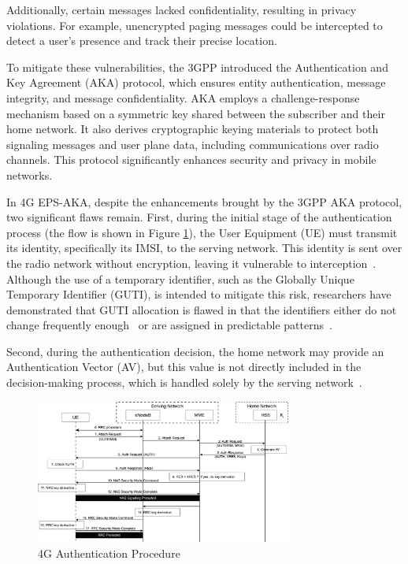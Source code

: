 Additionally, certain messages lacked confidentiality, resulting in privacy violations. For example, unencrypted paging messages could be intercepted to detect a user’s presence and track their precise location. 

To mitigate these vulnerabilities, the 3GPP introduced the Authentication and Key Agreement (AKA) protocol, which ensures entity authentication, message integrity, and message confidentiality. AKA employs a challenge-response mechanism based on a symmetric key shared between the subscriber and their home network. It also derives cryptographic keying materials to protect both signaling messages and user plane data, including communications over radio channels. This protocol significantly enhances security and privacy in mobile networks.

In 4G EPS-AKA, despite the enhancements brought by the 3GPP AKA protocol, two significant flaws remain. First, during the initial stage of the authentication process (the flow is shown in Figure \ref{fig:4g-authentication-procedure}), the User Equipment (UE) must transmit its identity, specifically its IMSI, to the serving network. This identity is sent over the radio network without encryption, leaving it vulnerable to interception~\cite{cbl-comp-4g-5g-p3}. Although the use of a temporary identifier, such as the Globally Unique Temporary Identifier (GUTI), is intended to mitigate this risk, researchers have demonstrated that GUTI allocation is flawed in that the identifiers either do not change frequently enough~\cite{gt-freq} or are assigned in predictable patterns~\cite{gt-pred}.

Second, during the authentication decision, the home network may provide an Authentication Vector (AV), but this value is not directly included in the decision-making process, which is handled solely by the serving network~\cite{cbl-comp-4g-5g-p4}.

\begin{figure}[htbp]
    \centering
    \includegraphics[width=0.75\textwidth]{figs/4g-authentication-procedure.png}
    \caption{\ac{4G} Authentication Procedure}
    \label{fig:4g-authentication-procedure}
\end{figure}

